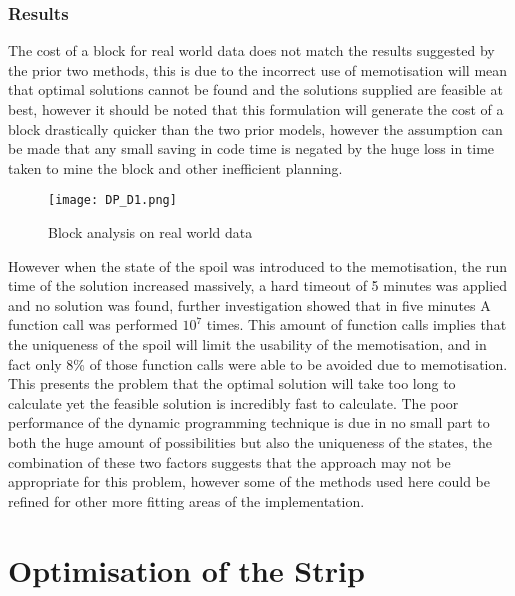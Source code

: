 \subsubsection{Results}
The cost of a block for real world data does not match the results suggested by the prior two methods, this is due to the incorrect use of memotisation will mean that optimal solutions cannot be found and the solutions supplied are feasible at best, however it should be noted that this formulation will generate the cost of a block drastically quicker than the two prior models, however the assumption can be made that any small saving in code time is negated by the huge loss in time taken to mine the block and other inefficient planning. 
\begin{figure}[h]
\caption{Block analysis on real world data }
\label{DP1}
\texttt{[image: DP\_D1.png]}
\end{figure}
However when the state of the spoil was introduced to the memotisation, the run time of the solution increased massively, a hard timeout of 5 minutes was applied and no solution was found, further investigation showed that in five minutes A function call was performed $10^7$ times. This amount of function calls implies that the uniqueness of the spoil will limit the usability of the memotisation, and in fact only 8\% of those function calls were able to be avoided due to memotisation. This presents the problem that the optimal solution will take too long to calculate yet the feasible solution is incredibly fast to calculate. The poor performance of the dynamic programming technique is due in no small part to both the huge amount of possibilities but also the uniqueness of the states, the combination of these two factors suggests that the approach may not be appropriate for this problem, however some of the methods used here could be refined for other more fitting areas of the implementation.  

\section{Optimisation of the Strip}
